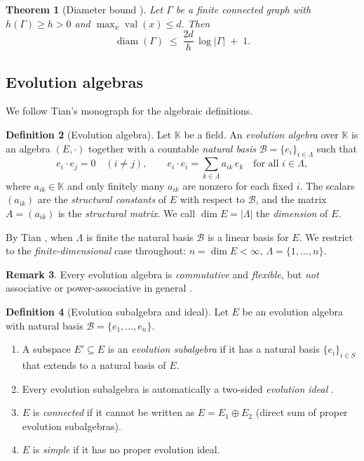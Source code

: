 \documentclass[12pt,a4paper]{amsart}
\newtheorem{theorem}{Theorem}[section]
\theoremstyle{definition}
\newtheorem{definition}[theorem]{Definition}
\newtheorem{remark}[theorem]{Remark}
\DeclareMathOperator{\val}{val}
\DeclareMathOperator{\diam}{diam}
\newcommand{\K}{\mathbb{K}}
\newcommand{\hh}{h}          %
\newcommand{\EA}{E}          %
\newcommand{\natbasis}{\mathcal{B}}  %
\newcommand{\strmat}{A}      %
\begin{document}
\begin{theorem}[Diameter bound {\cite[Corollary~3.1.10]{Kowalski2019}}]
\label{thm:diam-expander}
Let $\varGamma$ be a finite connected graph with
$\hh(\varGamma)\ge h>0$ and $\max_{x}\val(x)\le d$.  Then
\[
  \diam(\varGamma) \;\le\;
  \frac{2d}{h}\,\log|\varGamma|  \;+\;1.
\]
\end{theorem}

\subsection{Evolution algebras}\label{sub:ea}

We follow Tian's monograph \cite{Tian2008} for the algebraic
definitions.

\begin{definition}[Evolution algebra]\label{def:ea}
Let $\K$ be a field.  An \emph{evolution algebra} over $\K$ is an
algebra $(\EA,\cdot)$ together with a countable \emph{natural basis}
$\natbasis=\{e_i\}_{i\in\Lambda}$ such that
\[
  e_i \cdot e_j = 0 \quad (i\ne j),
  \qquad
  e_i \cdot e_i = \sum_{k\in\Lambda} a_{ik}\,e_k \quad
  \text{for all }i\in\Lambda,
\]
where $a_{ik}\in\K$ and only finitely many $a_{ik}$ are nonzero for
each fixed $i$.  The scalars $(a_{ik})$ are the
\emph{structural constants} of $\EA$ with respect to $\natbasis$, and
the matrix $\strmat=(a_{ik})$ is the \emph{structural matrix}.  We
call $\dim\EA=|\Lambda|$ the \emph{dimension} of $\EA$.
\end{definition}

By Tian \cite[Theorem~1]{Tian2008}, when $\Lambda$ is finite the
natural basis $\natbasis$ is a linear basis for $\EA$.  We restrict to
the \emph{finite-dimensional} case throughout:
$n=\dim\EA<\infty$, $\Lambda=\{1,\ldots,n\}$.

\begin{remark}
Every evolution algebra is \emph{commutative} and \emph{flexible}, but
\emph{not} associative or power-associative in general
\cite[Corollary~1]{Tian2008}.
\end{remark}

\begin{definition}[Evolution subalgebra and ideal]\label{def:subalg}
Let $\EA$ be an evolution algebra with natural basis $\natbasis=
\{e_1,\ldots,e_n\}$.
\begin{enumerate}[label=\normalfont(\roman*)]
  \item A subspace $\EA'\subseteq\EA$ is an \emph{evolution subalgebra}
        if it has a natural basis $\{e_i\}_{i\in S}$ that extends to a
        natural basis of $\EA$.
  \item Every evolution subalgebra is automatically a two-sided
        \emph{evolution ideal}
        \cite[Proposition~2]{Tian2008}.
  \item $\EA$ is \emph{connected} if it cannot be written as
        $\EA=\EA_1\oplus\EA_2$ (direct sum of proper evolution subalgebras).
  \item $\EA$ is \emph{simple} if it has no proper evolution ideal.
\end{enumerate}
\end{definition}
\end{document}
